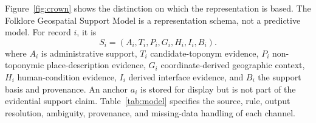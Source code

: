 \documentclass{isprs}
\begin{document}
Figure~\ref{fig:crown} shows the distinction on which the representation is based. The Folklore Geospatial Support Model is a representation schema, not a predictive model. For record \(i\), it is
\begin{equation}
S_i=(A_i,T_i,P_i,G_i,H_i,I_i,B_i).
\label{eq:support}
\end{equation}
where \(A_i\) is administrative support, \(T_i\) candidate-toponym evidence, \(P_i\) non-toponymic place-description evidence, \(G_i\) coordinate-derived geographic context, \(H_i\) human-condition evidence, \(I_i\) derived interface evidence, and \(B_i\) the support basis and provenance. An anchor \(a_i\) is stored for display but is not part of the evidential support claim. Table~\ref{tab:model} specifies the source, rule, output resolution, ambiguity, provenance, and missing-data handling of each channel.
\end{document}
